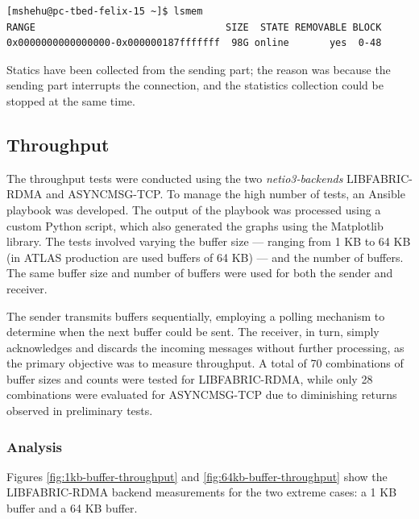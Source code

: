 \begin{lstlisting}[caption={Memory information}, label={lst:memory}]
[mshehu@pc-tbed-felix-15 ~]$ lsmem
RANGE                                 SIZE  STATE REMOVABLE BLOCK
0x0000000000000000-0x000000187fffffff  98G online       yes  0-48
\end{lstlisting}

Statics have been collected from the sending part; the reason was because the sending part interrupts the connection, and the statistics collection could be stopped at the same time.

\subsection{Throughput}

The throughput tests were conducted using the two \textit{netio3-backends} LIBFABRIC-RDMA and ASYNCMSG-TCP. To manage the high number of tests, an Ansible \cite{ansible} playbook was developed. The output of the playbook was processed using a custom Python script, which also generated the graphs using the Matplotlib \cite{matplotlib} library. The tests involved varying the buffer size --- ranging from 1 KB to 64 KB  (in ATLAS production are used buffers of 64 KB) --- and the number of buffers. The same buffer size and number of buffers were used for both the sender and receiver. 

The sender transmits buffers sequentially, employing a polling mechanism to determine when the next buffer could be sent. The receiver, in turn, simply acknowledges and discards the incoming messages without further processing, as the primary objective was to measure throughput. A total of 70 combinations of buffer sizes and counts were tested for LIBFABRIC-RDMA, while only 28 combinations were evaluated for ASYNCMSG-TCP due to diminishing returns observed in preliminary tests.

\subsubsection{Analysis}

Figures \ref{fig:1kb-buffer-throughput} and \ref{fig:64kb-buffer-throughput} show the LIBFABRIC-RDMA backend measurements for the two extreme cases: a 1 KB buffer and a 64 KB buffer.


